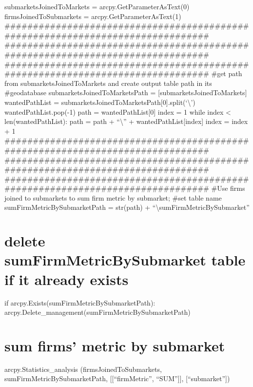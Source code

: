 \documentclass[]{article}
\begin{document}
submarketsJoinedToMarkets = arcpy.GetParameterAsText(0)
firmsJoinedToSubmarkets = arcpy.GetParameterAsText(1)
\#\#\#\#\#\#\#\#\#\#\#\#\#\#\#\#\#\#\#\#\#\#\#\#\#\#\#\#\#\#\#\#\#\#\#\#\#\#\#\#\#\#\#\#\#\#\#\#\#\#\#\#\#\#\#\#\#\#\#\#\#\#\#\#\#\#\#\#\#\#\#\#\#\#\#\#\#\#\#
\#\#\#\#\#\#\#\#\#\#\#\#\#\#\#\#\#\#\#\#\#\#\#\#\#\#\#\#\#\#\#\#\#\#\#\#\#\#\#\#\#\#\#\#\#\#\#\#\#\#\#\#\#\#\#\#\#\#\#\#\#\#\#\#\#\#\#\#\#\#\#\#\#\#\#\#\#\#\#
\#\#\#\#\#\#\#\#\#\#\#\#\#\#\#\#\#\#\#\#\#\#\#\#\#\#\#\#\#\#\#\#\#\#\#\#\#\#\#\#\#\#\#\#\#\#\#\#\#\#\#\#\#\#\#\#\#\#\#\#\#\#\#\#\#\#\#\#\#\#\#\#\#\#\#\#\#\#\#
\#get path from submarketsJoinedToMarkets and create output table path
in its \#geodatabase submarketsJoinedToMarketsPath =
{[}submarketsJoinedToMarkets{]} wantedPathList =
submarketsJoinedToMarketsPath{[}0{]}.split(`\textbackslash{}')
wantedPathList.pop(-1) path = wantedPathList{[}0{]} index = 1 while
index \textless{} len(wantedPathList): path = path +
``\textbackslash{}'' + wantedPathList{[}index{]} index = index + 1
\#\#\#\#\#\#\#\#\#\#\#\#\#\#\#\#\#\#\#\#\#\#\#\#\#\#\#\#\#\#\#\#\#\#\#\#\#\#\#\#\#\#\#\#\#\#\#\#\#\#\#\#\#\#\#\#\#\#\#\#\#\#\#\#\#\#\#\#\#\#\#\#\#\#\#\#\#\#\#
\#\#\#\#\#\#\#\#\#\#\#\#\#\#\#\#\#\#\#\#\#\#\#\#\#\#\#\#\#\#\#\#\#\#\#\#\#\#\#\#\#\#\#\#\#\#\#\#\#\#\#\#\#\#\#\#\#\#\#\#\#\#\#\#\#\#\#\#\#\#\#\#\#\#\#\#\#\#\#
\#\#\#\#\#\#\#\#\#\#\#\#\#\#\#\#\#\#\#\#\#\#\#\#\#\#\#\#\#\#\#\#\#\#\#\#\#\#\#\#\#\#\#\#\#\#\#\#\#\#\#\#\#\#\#\#\#\#\#\#\#\#\#\#\#\#\#\#\#\#\#\#\#\#\#\#\#\#\#
\#Use firms joined to submarkets to sum firm metric by submarket; \#set
table name sumFirmMetricBySubmarketPath = str(path) +
``\textbackslash{}sumFirmMetricBySubmarket''

\section{delete sumFirmMetricBySubmarket table if it already
exists}\label{delete-sumfirmmetricbysubmarket-table-if-it-already-exists}

if arcpy.Exists(sumFirmMetricBySubmarketPath):
arcpy.Delete\_management(sumFirmMetricBySubmarketPath)

\section{sum firms' metric by
submarket}\label{sum-firms-metric-by-submarket}

arcpy.Statistics\_analysis (firmsJoinedToSubmarkets,
sumFirmMetricBySubmarketPath, {[}{[}``firmMetric'', ``SUM''{]}{]},
{[}``submarket''{]})
\end{document}

